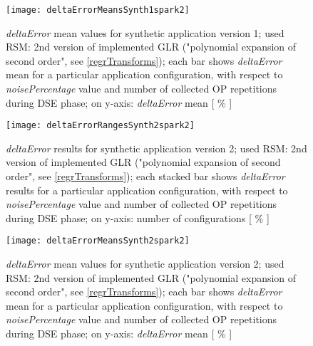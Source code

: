 \begin{figure}[H]

    \centering
    
    \texttt{[image: deltaErrorMeansSynth1spark2]}
    
    \caption{\textit{deltaError} mean values for synthetic application version 1; used RSM: 2nd version of implemented GLR ("polynomial expansion of second order", see \ref{regrTransforms}); each bar shows \textit{deltaError} mean for a particular application configuration, with respect to \textit{noisePercentage} value and number of collected OP repetitions during DSE phase; on y-axis: \textit{deltaError} mean [ \% ]}
    
    \label{fig::synth1spark2::means}
    
\end{figure}





\begin{figure}[H]

    \centering
    
    \texttt{[image: deltaErrorRangesSynth2spark2]}
    
     \caption{\textit{deltaError} results for synthetic application version 2; used RSM: 2nd version of implemented GLR ("polynomial expansion of second order", see \ref{regrTransforms}); each stacked bar shows \textit{deltaError} results for a particular application configuration, with respect to \textit{noisePercentage} value and number of collected OP repetitions during DSE phase; on y-axis: number of configurations [ \% ]}
    
    \label{fig::synth2spark2::intervals}
    
\end{figure}

\begin{figure}[H]

    \centering
    
    \texttt{[image: deltaErrorMeansSynth2spark2]}
    
    \caption{\textit{deltaError} mean values for synthetic application version 2; used RSM: 2nd version of implemented GLR ("polynomial expansion of second order", see \ref{regrTransforms}); each bar shows \textit{deltaError} mean for a particular application configuration, with respect to \textit{noisePercentage} value and number of collected OP repetitions during DSE phase; on y-axis: \textit{deltaError} mean [ \% ]}
    
    \label{fig::synth2spark2::means}
    
\end{figure}





